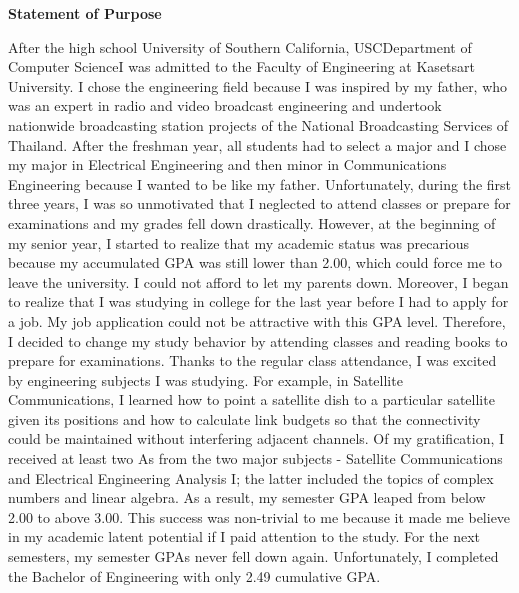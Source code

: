 \documentclass[a4paper]{report}
\newcommand{\university}{University of Southern California}
\newcommand{\department}{Department of Computer Science}
\newcommand{\uniabbre}{USC}
\begin{document}
\begin{center}
\textbf{\large Statement of Purpose}
\end{center}

\vspace{0.4cm}
After the high school \university, \uniabbre \department I was admitted to the Faculty of Engineering at Kasetsart University. I chose the engineering field because I was inspired by my father, who was an expert in radio and video broadcast engineering and undertook nationwide broadcasting station projects of the National Broadcasting Services of Thailand. After the freshman year, all students had to select a major and I chose my major in Electrical Engineering and then minor in Communications Engineering because I wanted to be like my father. Unfortunately, during the first three years, I was so unmotivated that I neglected to attend classes or prepare for examinations and my grades fell down drastically. However, at the beginning of my senior year, I started to realize that my academic status was precarious because my accumulated GPA was still lower than 2.00, which could force me to leave the university. I could not afford to let my parents down. Moreover, I began to realize that I was studying in college for the last year before I had to apply for a job. My job application could not be attractive with this GPA level. Therefore, I decided to change my study behavior by attending classes and reading books to prepare for examinations. Thanks to the regular class attendance, I was excited by engineering subjects I was studying. For example, in Satellite Communications, I learned how to point a satellite dish to a particular satellite given its positions and how to calculate link budgets so that the connectivity could be maintained without interfering adjacent channels. Of my gratification, I received at least two As from the two major subjects -  Satellite Communications and Electrical Engineering Analysis I; the latter included the topics of complex numbers and linear algebra. As a result, my semester GPA leaped from below 2.00 to above 3.00. This success was non-trivial to me because it made me believe in my academic latent potential if I paid attention to the study. For the next semesters, my semester GPAs never fell down again. Unfortunately, I completed the Bachelor of Engineering with only 2.49 cumulative GPA.
\end{document}
